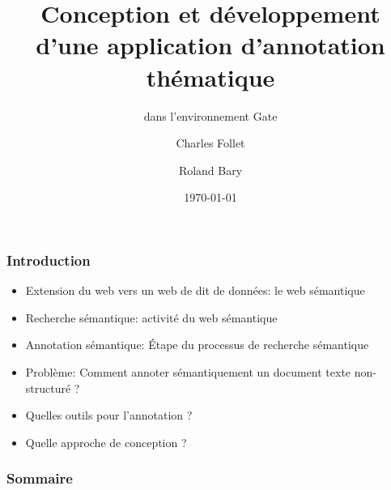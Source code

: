 \documentclass[10pt, compress]{beamer}
\title{Conception et développement d’une application d’annotation thématique}
\subtitle{dans l’environnement Gate}
\date{\today}
\author{Charles Follet \and Roland Bary}
\institute{Université de Pau et Pays de l'Adour}
\begin{document}
\maketitle
\begin{frame}[fragile]
	\frametitle{Introduction}
		\begin{itemize}[<+->]
  			[square]
  			\item{Extension du web vers un web de dit de données: le web sémantique}
  			\item{Recherche sémantique: activité du web sémantique}
  			\item{Annotation sémantique: Étape du processus de recherche sémantique}
  			\item{Problème: Comment annoter sémantiquement un document texte non-structuré ?}
  			\item{Quelles outils pour l'annotation ?}
  			\item{Quelle approche de conception ?}
  		\end{itemize}
\end{frame}

\begin{frame}[fragile]
  \frametitle{Sommaire}
  \tableofcontents
\end{frame}
\end{document}
